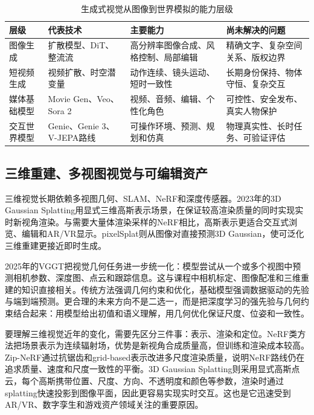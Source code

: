 \documentclass[UTF8,a4paper,12pt]{ctexart}
\newcommand{\model}[1]{\textsf{#1}}
\begin{document}
\begin{table}[htbp]
\centering
\small
\caption{生成式视觉从图像到世界模拟的能力层级}
\begin{tabularx}{\textwidth}{C{2.6cm}Y Y Y}
\toprule
\textbf{层级} & \textbf{代表技术} & \textbf{主要能力} & \textbf{尚未解决的问题} \\
\midrule
图像生成 & 扩散模型、DiT、整流流 & 高分辨率图像合成、风格控制、局部编辑 & 精确文字、复杂空间关系、版权边界 \\
短视频生成 & 视频扩散、时空潜变量 & 动作连续、镜头运动、短时一致性 & 长期身份保持、物体守恒、复杂交互 \\
媒体基础模型 & Movie Gen、Veo、Sora 2 & 视频、音频、编辑、个性化角色 & 可控性、安全发布、真实人物保护 \\
交互世界模型 & Genie、Genie 3、V-JEPA路线 & 可操作环境、预测、规划和仿真 & 物理真实性、长时任务、可验证评估 \\
\bottomrule
\end{tabularx}
\end{table}

\subsection{三维重建、多视图视觉与可编辑资产}
三维视觉长期依赖多视图几何、SLAM、NeRF和深度传感器。2023年的\model{3D Gaussian Splatting}用显式三维高斯表示场景，在保证较高渲染质量的同时实现实时新视角渲染\cite{gs3d}。与需要大量体渲染采样的NeRF相比，高斯表示更适合交互式浏览、编辑和AR/VR显示。\model{pixelSplat}则从图像对直接预测3D Gaussian，使可泛化三维重建更接近即时生成\cite{pixelsplat}。

2025年的\model{VGGT}把视觉几何任务进一步统一化：模型尝试从一个或多个视图中预测相机参数、深度图、点云和跟踪信息\cite{vggt}。这与课程中相机标定、图像配准和三维重建的知识直接相关。传统方法强调几何约束和优化，基础模型强调数据驱动的先验与端到端预测。更合理的未来方向不是二选一，而是把深度学习的强先验与几何约束结合起来：用模型给出初值和语义理解，用几何优化保证尺度、位姿和一致性。

要理解三维视觉近年的变化，需要先区分三件事：表示、渲染和定位。NeRF类方法把场景表示为连续辐射场，优势是新视角合成质量高，但训练和渲染成本较高。\model{Zip-NeRF}通过抗锯齿和grid-based表示改进多尺度渲染质量\cite{zipnerf}，说明NeRF路线仍在追求质量、速度和尺度一致性的平衡。\model{3D Gaussian Splatting}则采用显式高斯点云，每个高斯携带位置、尺度、方向、不透明度和颜色等参数，渲染时通过splatting快速投影到图像平面，因此更容易实现实时交互\cite{gs3d}。这也是它迅速受到AR/VR、数字孪生和游戏资产领域关注的重要原因。
\end{document}
